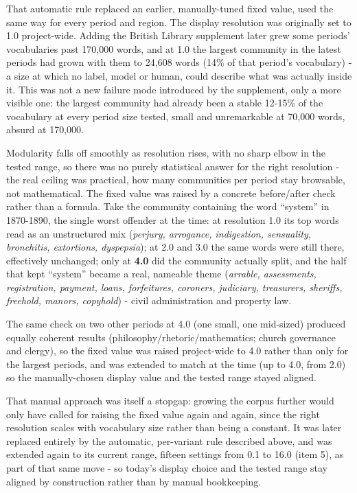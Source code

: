 \documentclass[11pt]{article}
\begin{document}
That automatic rule replaced an earlier, manually-tuned fixed value,
used the same way for every period and region. The display resolution
was originally set to 1.0 project-wide. Adding the British Library
supplement later grew some periods' vocabularies past 170{,}000 words,
and at 1.0 the largest community in the latest periods had grown with
them to 24{,}608 words (14\% of that period's vocabulary) - a size at
which no label, model or human, could describe what was actually
inside it. This was not a new failure mode introduced by the
supplement, only a more visible one: the largest community had already
been a stable 12-15\% of the vocabulary at every period size tested,
small and unremarkable at 70{,}000 words, absurd at 170{,}000.

Modularity falls off smoothly as resolution rises, with no sharp elbow
in the tested range, so there was no purely statistical answer for the
right resolution - the real ceiling was practical, how many communities
per period stay browsable, not mathematical. The fixed value was raised
by a concrete before/after check rather than a formula. Take the
community containing the word ``system'' in 1870-1890, the single worst
offender at the time: at resolution 1.0 its top words read as an
unstructured mix (\emph{perjury, arrogance, indigestion, sensuality,
bronchitis, extortions, dyspepsia}); at 2.0 and 3.0 the same words were
still there, effectively unchanged; only at \textbf{4.0} did the
community actually split, and the half that kept ``system'' became a
real, nameable theme (\emph{arrable, assessments, registration,
payment, loans, forfeitures, coroners, judiciary, treasurers, sheriffs,
freehold, manors, copyhold}) - civil administration and property law.

The same check on two other periods at 4.0 (one small, one mid-sized)
produced equally coherent results (philosophy/rhetoric/mathematics;
church governance and clergy), so the fixed value was raised
project-wide to 4.0 rather than only for the largest periods, and
 was extended to match at the time (up
to 4.0, from 2.0) so the manually-chosen display value and the tested
range stayed aligned.

That manual approach was itself a stopgap: growing the corpus further
would only have called for raising the fixed value again and again,
since the right resolution scales with vocabulary size rather than
being a constant. It was later replaced entirely by the automatic,
per-variant rule described above, and 
was extended again to its current range, fifteen settings from 0.1 to
16.0 (item 5), as part of that same move - so today's display choice
and the tested range stay aligned by construction rather than by manual
bookkeeping.
\end{document}
